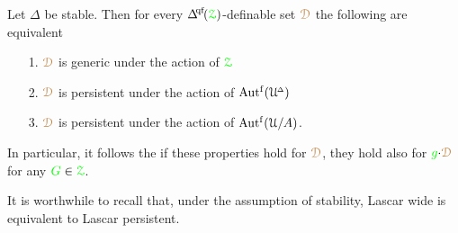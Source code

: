 \begin{theorem}\label{thm_Ggeneric_persistent}
  Let $\Delta$ be stable.
  Then for every $\qfDelta(\grZ)$-definable set ${\color{brown}\EuScript D}$ the following are equivalent
  \begin{itemize}
    \item [1.] ${\color{brown}\EuScript D}$ is generic under the action of ${\color{green}\EuScript Z}$
    \item [2.] ${\color{brown}\EuScript D}$ is persistent under the action of $\mbox{Aut$^{\rm f}$}(\EuScript U\kern-.2ex^{\scriptscriptstyle\Delta})$
    \item [3.] ${\color{brown}\EuScript D}$ is persistent under the action of $\mbox{Aut$^{\rm f}$}(\EuScript U/A)$.
  \end{itemize}
  In particular, it follows the if these properties hold for ${\color{brown}\EuScript D}$, they hold also for ${\color{green} g}{\cdot}{\color{brown}\EuScript D}$ for any ${\color{green} G}\in{\color{green}\EuScript Z}$. 
\end{theorem}

It is worthwhile to recall that, under the assumption of stability, Lascar wide is equivalent to Lascar persistent.

